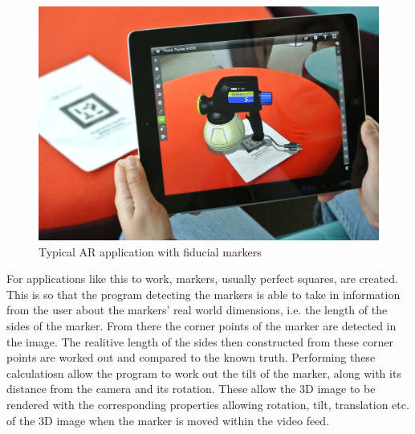\documentclass[11pt]{article}
\begin{document}
\begin{figure}[!h]
	\centering
	\includegraphics[scale=0.9]{pics/fiducialexample.jpg}
	\caption{Typical AR application with fiducial markers}
	\label{fiducialexample}
\end{figure}

For applications like this to work, markers, usually perfect squares, are
created. This is so that the program detecting the markers is able to
take in information from the user about the markers' real world dimensions,
i.e. the length of the sides of the marker. From there the corner points 
of the marker are detected in the image. The realitive length of the sides 
then constructed from these corner points are worked out and
compared to the known truth. Performing these calculatiosn allow the 
program to work out the tilt of the marker, along with its 
distance from the camera and its rotation. These allow the 3D image to be 
rendered with the corresponding properties allowing rotation, tilt,
translation etc. of the 3D image when the marker is moved within 
the video feed.
\end{document}
